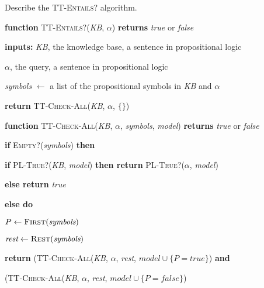 \begin{flashcard}[Question]{Describe the \textsc{TT-Entails?} algorithm.}
\footnotesize
\begin{center}
\begin{minipage}{0.9\textwidth}
\textbf{function} \textsc{TT-Entails?}(\textit{KB}, $\alpha$) \textbf{returns} \textit{true} or \textit{false}

\quad \textbf{inputs:} \textit{KB}, the knowledge base, a sentence in propositional logic

\quad \quad \quad \quad \quad $\alpha$, the query, a sentence in propositional logic

\medskip

\quad \textit{symbols} $\leftarrow$ a list of the propositional symbols in \textit{KB} and $\alpha$

\quad \textbf{return} \textsc{TT-Check-All}(\textit{KB}, $\alpha$, $\{\}$)

\medskip

\textbf{function} \textsc{TT-Check-All}(\textit{KB}, $\alpha$, \textit{symbols}, \textit{model}) \textbf{returns} \textit{true} or \textit{false}

\quad \textbf{if} \textsc{Empty?}(\textit{symbols}) \textbf{then}

\quad \quad \textbf{if} \textsc{PL-True?}(\textit{KB}, \textit{model}) \textbf{then return} \textsc{PL-True?}($\alpha$, \textit{model})

\quad \quad \textbf{else return} \textit{true}

\quad \textbf{else do}

\quad \quad $P \leftarrow \textsc{First}(\textit{symbols})$

\quad \quad $\textit{rest} \leftarrow \textsc{Rest}(\textit{symbols})$

\quad \quad \textbf{return} (\textsc{TT-Check-All}(\textit{KB}, $\alpha$, \textit{rest}, $\textit{model} \cup \{ P = \textit{true} \}$) \textbf{and}

\quad \quad \quad \quad \quad \; (\textsc{TT-Check-All}(\textit{KB}, $\alpha$, \textit{rest}, $\textit{model} \cup \{ P = \textit{false} \}$)
\end{minipage}
\end{center}
\end{flashcard}

